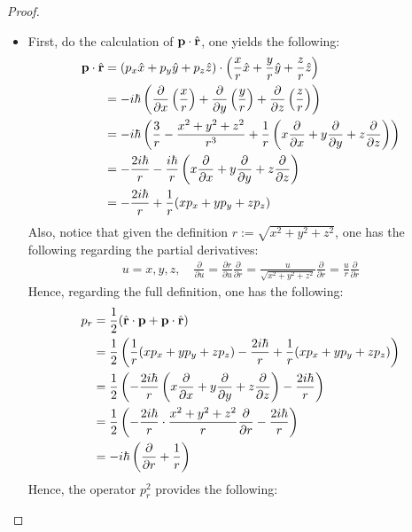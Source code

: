\documentclass{article}
\begin{document}
\begin{proof}
\begin{itemize}
        \item[(b)] First, do the calculation of $\mathbf{p}\cdot\hat{\mathbf{r}}$, one yields the following:
        \begin{align}
            \mathbf{p}\cdot\hat{\mathbf{r}} &= \left(p_x\hat{x}+p_y\hat{y}+p_z\hat{z}\right)\cdot \left(\frac{x}{r}\hat{x}+\frac{y}{r}\hat{y}+\frac{z}{r}\hat{z}\right)\\
            &= -i\hbar\left(\frac{\partial}{\partial x}\left(\frac{x}{r}\right)+\frac{\partial}{\partial y}\left(\frac{y}{r}\right)+\frac{\partial}{\partial z}\left(\frac{z}{r}\right)\right)\\
            &= -i\hbar\left(\frac{3}{r}-\frac{x^2+y^2+z^2}{r^3} + \frac{1}{r}\left(x\frac{\partial}{\partial x}+y\frac{\partial}{\partial y}+z\frac{\partial}{\partial z}\right)\right)\\
            &= -\frac{2i\hbar}{r}-\frac{i\hbar}{r}\left(x\frac{\partial}{\partial x}+y\frac{\partial}{\partial y}+z\frac{\partial}{\partial z}\right)\\
            &= -\frac{2i\hbar}{r}+\frac{1}{r}(xp_x+yp_y+zp_z)
        \end{align}
        Also, notice that given the definition $r:=\sqrt{x^2+y^2+z^2}$, one has the following regarding the partial derivatives:
        \begin{align}
            u=x,y,z,\quad \frac{\partial}{\partial u} = \frac{\partial r}{\partial u}\frac{\partial }{\partial r}=\frac{u}{\sqrt{x^2+y^2+z^2}}\frac{\partial}{\partial r}=\frac{u}{r}\frac{\partial}{\partial r}
        \end{align}
        Hence, regarding the full definition, one has the following:
        \begin{align}
            p_r &= \frac{1}{2}(\hat{\mathbf{r}}\cdot\mathbf{p}+\mathbf{p}\cdot\hat{\mathbf{r}})\\
            &= \frac{1}{2}\left(\frac{1}{r}(xp_x+yp_y+zp_z) - \frac{2i\hbar}{r}+\frac{1}{r}(xp_x+yp_y+zp_z)\right)\\
            &= \frac{1}{2}\left(-\frac{2i\hbar}{r}\left(x\frac{\partial}{\partial x}+y\frac{\partial}{\partial y}+z\frac{\partial}{\partial z}\right)-\frac{2i\hbar}{r}\right)\\
            &= \frac{1}{2}\left(-\frac{2i\hbar}{r}\cdot\frac{x^2+y^2+z^2}{r}\frac{\partial}{\partial r}-\frac{2i\hbar}{r}\right)\\
            &= -i\hbar\left(\frac{\partial}{\partial r}+\frac{1}{r}\right)
        \end{align}
        Hence, the operator $p_r^2$ provides the following:

\end{itemize}
\end{proof}
\end{document}

